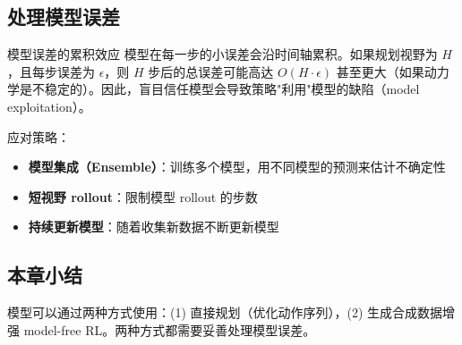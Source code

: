 \subsection{处理模型误差}

\begin{warningbox}{模型误差的累积效应}
模型在每一步的小误差会沿时间轴累积。如果规划视野为 $H$，且每步误差为 $\epsilon$，则 $H$ 步后的总误差可能高达 $O(H \cdot \epsilon)$ 甚至更大（如果动力学是不稳定的）。因此，盲目信任模型会导致策略"利用"模型的缺陷（model exploitation）。
\end{warningbox}

应对策略：
\begin{itemize}
    \item \textbf{模型集成（Ensemble）}：训练多个模型，用不同模型的预测来估计不确定性
    \item \textbf{短视野 rollout}：限制模型 rollout 的步数
    \item \textbf{持续更新模型}：随着收集新数据不断更新模型
\end{itemize}

\subsection{本章小结}

模型可以通过两种方式使用：(1) 直接规划（优化动作序列），(2) 生成合成数据增强 model-free RL。两种方式都需要妥善处理模型误差。


